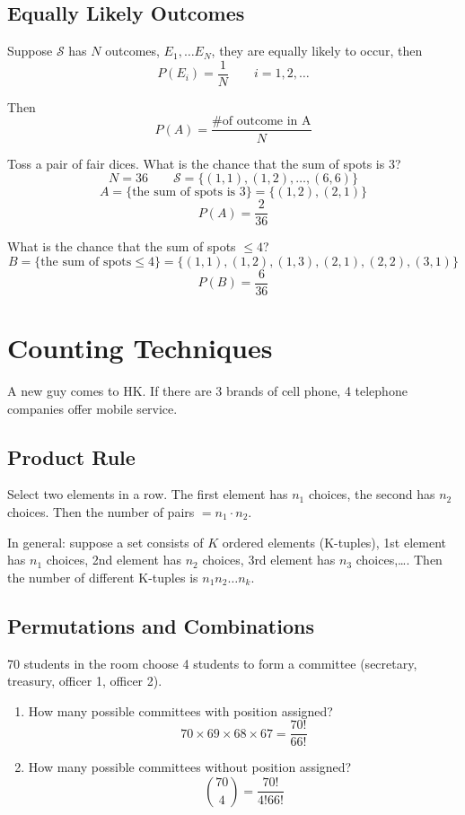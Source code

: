 \subsection{Equally Likely Outcomes}
Suppose $\mathcal{S}$ has $N$ outcomes, $E_1,\dots E_N$, they are equally likely to occur, then
\[P(E_i)=\frac{1}{N} \qquad i=1,2,\dots\]

Then 
\[P(A)=\frac{\text{\# of outcome in A}}{N}\]

\begin{exmp}
Toss a pair of fair dices. What is the chance that the sum of spots is 3?
\[N=36 \qquad \mathcal{S}=\{(1,1),(1,2),\dots ,(6,6)\}\]
\[A=\{\text{the sum of spots is 3}\}=\{(1,2),(2,1)\}\]
\[P(A)=\frac{2}{36}\]
\end{exmp}

\begin{exmp}
What is the chance that the sum of spots $\leq 4$?
\[B=\{\text{the sum of spots}\leq 4\}=\{(1,1),(1,2),(1,3),(2,1),(2,2),(3,1)\}\]
\[P(B)=\frac{6}{36}\]
\end{exmp}

\section{Counting Techniques}
\begin{exmp}
A new guy comes to HK. If there are 3 brands of cell phone, 4 telephone companies offer mobile service.

\end{exmp}

\subsection{Product Rule}
Select two elements in a row. The first element has $n_1$ choices, the second has $n_2$ choices. Then the number of pairs $ = n_1 \cdot n_2$.

In general: suppose a set consists of $K$ ordered elements (K-tuples), 1st element has $n_1$ choices, 2nd element has $n_2$ choices, 3rd element has $n_3$ choices,\dots. Then the number of different K-tuples is $n_1 n_2 \dots n_k$.


\subsection{Permutations and Combinations}
\begin{exmp}
70 students in the room choose 4 students to form a committee (secretary, treasury, officer 1, officer 2).
\begin{enumerate}
\item How many possible committees with position assigned?
\[70 \times 69 \times 68 \times 67=\frac{70!}{66!} \]
\item How many possible committees without position assigned?
\[{70 \choose 4} =\frac{70!}{4!66!}\]
\end{enumerate}
\end{exmp}

